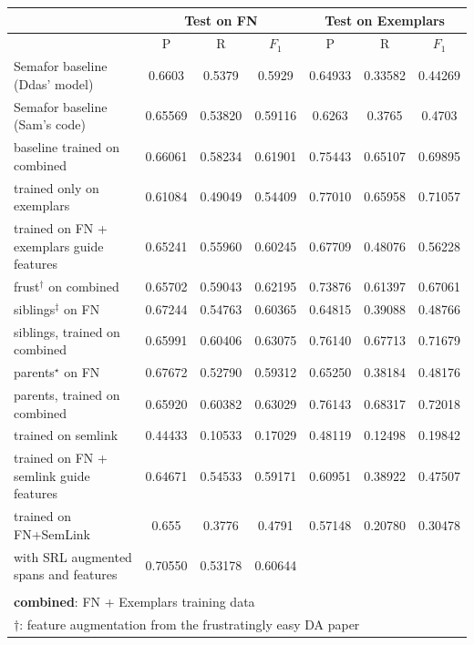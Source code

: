 \documentclass[11pt,a4paper]{article}
\begin{document}
\begin{table}
\begin{small}
\begin{tabular}{|l|c|c|c|c|c|c|}\hline
& \multicolumn{3}{c|}{\textbf{Test on FN}} & \multicolumn{3}{c|}{\textbf{Test on Exemplars}} \\ \hline
 & P & R & $F_1$ & P & R & $F_1$ \\ \hline
 Semafor baseline (Ddas' model) & 0.6603 & 0.5379 & 0.5929 & 0.64933 & 0.33582 & 0.44269 \\ \hline
 Semafor baseline (Sam's code) & 0.65569 & 0.53820 & 0.59116 & 0.6263 & 0.3765 & 0.4703 \\ \hline
 baseline trained on combined &  0.66061 & 0.58234 & 0.61901 & 0.75443 & 0.65107 & 0.69895 \\ \hline
 trained only on exemplars & 0.61084 & 0.49049 & 0.54409 & 0.77010 & 0.65958 & 0.71057 \\ \hline
 trained on FN + exemplars guide features & 0.65241 & 0.55960 & 0.60245 & 0.67709 & 0.48076 & 0.56228 \\ \hline
 frust$^\dagger$ on combined &  0.65702 & 0.59043 & 0.62195 & 0.73876 & 0.61397 & 0.67061\\ \hline
 siblings$^\ddagger$ on FN & 0.67244 & 0.54763 & 0.60365 &  0.64815 & 0.39088 & 0.48766 \\ \hline
 siblings, trained on combined &  0.65991 & 0.60406 & 0.63075 & 0.76140 & 0.67713 & 0.71679 \\ \hline
 parents$^\star$ on FN &  0.67672 & 0.52790 & 0.59312 & 0.65250 & 0.38184 & 0.48176 \\ \hline
 parents, trained on combined &  0.65920 & 0.60382 & 0.63029 & 0.76143 & 0.68317 & 0.72018 \\ \hline
 trained on semlink & 0.44433 & 0.10533 & 0.17029 & 0.48119 & 0.12498 & 0.19842 \\ \hline
 trained on FN + semlink guide features & 0.64671 & 0.54533 & 0.59171 & 0.60951 & 0.38922 & 0.47507 \\ \hline
 trained on FN+SemLink & 0.655 & 0.3776 & 0.4791 & 0.57148 & 0.20780 & 0.30478 \\ \hline
 with SRL augmented spans and features & 0.70550 & 0.53178 & 0.60644 &  & &  \\ \hline
 \multicolumn{7}{l}{}\\
 \multicolumn{7}{l}{\textbf{combined}: FN + Exemplars training data}\\ \hline
 \multicolumn{7}{l}{$\dagger$: feature augmentation from the frustratingly easy DA paper}\\ \hline

\end{tabular}
\end{small}
\end{table}
\end{document}
